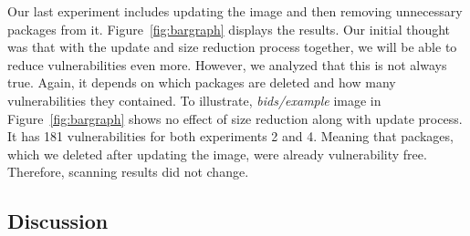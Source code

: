\documentclass[a4paper,num-refs]{oup-contemporary}
\begin{document}
Our last experiment includes updating the image and then removing unnecessary packages from it.
Figure~\ref{fig:bargraph} displays the results. 
Our initial thought was that with the update and size reduction process together, we will be able to
reduce vulnerabilities even more. However,
we analyzed that this is not always true. Again, it depends on which packages are deleted and how
many vulnerabilities they contained. To illustrate, \textit{bids/example} image in Figure~\ref{fig:bargraph}
shows no effect of size reduction along with update process. It has 181 vulnerabilities for both experiments 2 and 4.
Meaning that packages, which we deleted after updating the image, were already vulnerability free. Therefore,
scanning results did not change.

\subsection{Discussion}
\end{document}
